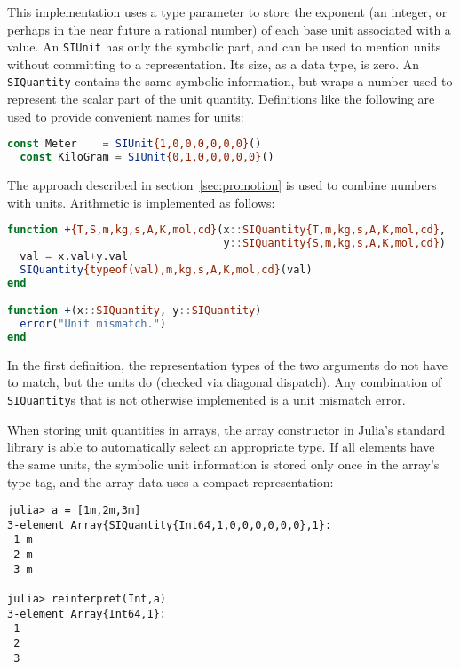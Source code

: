 \noindent
This implementation uses a type parameter to store the exponent (an integer,
or perhaps in the near future a rational number) of each base unit associated
with a value.
An \texttt{SIUnit} has only the symbolic part, and can be used to mention
units without committing to a representation.
Its size, as a data type, is zero.
An \texttt{SIQuantity} contains the same symbolic information, but wraps a
number used to represent the scalar part of the unit quantity.
Definitions like the following are used to provide convenient names for units:

\begin{singlespace}
\begin{lstlisting}[language=julia]
  const Meter    = SIUnit{1,0,0,0,0,0,0}()
  const KiloGram = SIUnit{0,1,0,0,0,0,0}()
\end{lstlisting}
\end{singlespace}

\noindent
The approach described in section~\ref{sec:promotion} is used to combine
numbers with units.
Arithmetic is implemented as follows:

\begin{singlespace}
\begin{lstlisting}[language=julia]
function +{T,S,m,kg,s,A,K,mol,cd}(x::SIQuantity{T,m,kg,s,A,K,mol,cd},
                                  y::SIQuantity{S,m,kg,s,A,K,mol,cd})
  val = x.val+y.val
  SIQuantity{typeof(val),m,kg,s,A,K,mol,cd}(val)
end

function +(x::SIQuantity, y::SIQuantity)
  error("Unit mismatch.")
end
\end{lstlisting}
\end{singlespace}

\noindent
In the first definition, the representation types of the two
arguments do not have to match, but the units do (checked via diagonal
dispatch).
Any combination of \texttt{SIQuantity}s that is not otherwise implemented
is a unit mismatch error.

When storing unit quantities in arrays, the array constructor in Julia's
standard library is able to automatically select an appropriate type.
If all elements have the same units, the symbolic unit information is
stored only once in the array's type tag, and the array data uses a
compact representation:

\vspace{-2ex}
\begin{singlespace}
\begin{verbatim}
julia> a = [1m,2m,3m]
3-element Array{SIQuantity{Int64,1,0,0,0,0,0,0},1}:
 1 m
 2 m
 3 m

julia> reinterpret(Int,a)
3-element Array{Int64,1}:
 1
 2
 3
\end{verbatim}
\end{singlespace}

